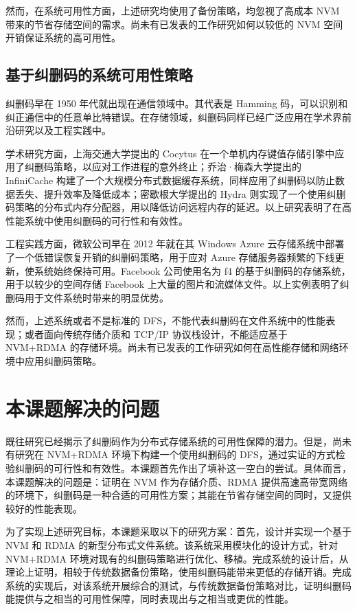 然而，在系统可用性方面，上述研究均使用了备份策略，均忽视了高成本 NVM 带来的节省存储空间的需求。尚未有已发表的工作研究如何以较低的 NVM 空间开销保证系统的高可用性。

\subsection{基于纠删码的系统可用性策略}
\label{subsec:ch1_ec_relworks}

纠删码早在 1950 年代就出现在通信领域中。其代表是 Hamming 码，可以识别和纠正通信中的任意单比特错误。在存储领域，纠删码同样已经广泛应用在学术界前沿研究以及工程实践中。

学术研究方面，上海交通大学提出的 Cocytus\cite{cocytus2016} 在一个单机内存键值存储引擎中应用了纠删码策略，以应对工作进程的意外终止；乔治·梅森大学提出的 InfiniCache\cite{infinicache2020} 构建了一个大规模分布式数据缓存系统，同样应用了纠删码以防止数据丢失、提升效率及降低成本；密歇根大学提出的 Hydra\cite{hydra2019} 则实现了一个使用纠删码策略的分布式内存分配器，用以降低访问远程内存的延迟。以上研究表明了在高性能系统中使用纠删码的可行性和有效性。

工程实践方面，微软公司早在 2012 年就在其 Windows Azure 云存储系统中部署了一个低错误恢复开销的纠删码策略\cite{azure2012}，用于应对 Azure 存储服务器频繁的下线更新，使系统始终保持可用。Facebook 公司使用名为 f4 的基于纠删码的存储系统\cite{facebook2014}，用于以较少的空间存储 Facebook 上大量的图片和流媒体文件。以上实例表明了纠删码用于文件系统时带来的明显优势。

然而，上述系统或者不是标准的 DFS，不能代表纠删码在文件系统中的性能表现；或者面向传统存储介质和 TCP/IP 协议栈设计，不能适应基于 NVM+RDMA 的存储环境。尚未有已发表的工作研究如何在高性能存储和网络环境中应用纠删码策略。

\section{本课题解决的问题}
\label{sec:ch1_thiswork}

既往研究已经揭示了纠删码作为分布式存储系统的可用性保障的潜力。但是，尚未有研究在 NVM+RDMA 环境下构建一个使用纠删码的 DFS，通过实证的方式检验纠删码的可行性和有效性。本课题首先作出了填补这一空白的尝试。具体而言，本课题解决的问题是：证明在 NVM 作为存储介质、RDMA 提供高速高带宽网络的环境下，纠删码是一种合适的可用性方案；其能在节省存储空间的同时，又提供较好的性能表现。

为了实现上述研究目标，本课题采取以下的研究方案：首先，设计并实现一个基于 NVM 和 RDMA 的新型分布式文件系统。该系统采用模块化的设计方式，针对 NVM+RDMA 环境对现有的纠删码策略进行优化、移植。完成系统的设计后，从理论上证明，相较于传统数据备份策略，使用纠删码能带来更低的存储开销。完成系统的实现后，对该系统开展综合的测试，与传统数据备份策略对比，证明纠删码能提供与之相当的可用性保障，同时表现出与之相当或更优的性能。
